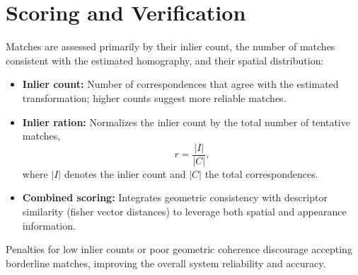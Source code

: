 \section{Scoring and Verification}
Matches are assessed primarily by their inlier count, the number of matches consistent with the estimated homography, and their spatial distribution:

    \begin{itemize}
        \item \textbf{Inlier count:} Number of correspondences that agree with the estimated transformation; higher counts suggest more reliable matches.
        \item \textbf{Inlier ration: } Normalizes the inlier count by the total number of tentative matches,
  $$
  r = \frac{|I|}{|C|},
  $$
  where $|I|$ denotes the inlier count and $|C|$ the total correspondences.
        \item \textbf{Combined scoring:} Integrates geometric consistency with descriptor similarity (fisher vector distances) to leverage both spatial and appearance information.
    \end{itemize}
Penalties for low inlier counts or poor geometric coherence discourage accepting borderline matches, improving the overall system reliability and accuracy.

